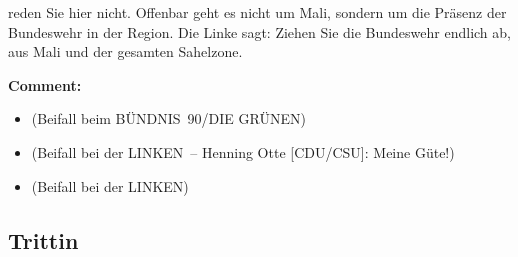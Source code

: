 \documentclass{article}
\begin{document}
reden Sie hier nicht. Offenbar geht es nicht um Mali, sondern um die Präsenz der Bundeswehr in der Region. Die Linke sagt: Ziehen Sie die Bundeswehr endlich ab, aus Mali und der gesamten Sahelzone.  

\noindent\textbf{Comment:}
\begin{itemize}
    \setlength\itemsep{-3pt}
    \item (Beifall beim BÜNDNIS 90/DIE GRÜNEN)
    \setlength\itemsep{-3pt}
    \item (Beifall bei der LINKEN – Henning Otte [CDU/CSU]: Meine Güte!)
    \setlength\itemsep{-3pt}
    \item (Beifall bei der LINKEN)
\end{itemize}
\subsection{Trittin}
\end{document}
